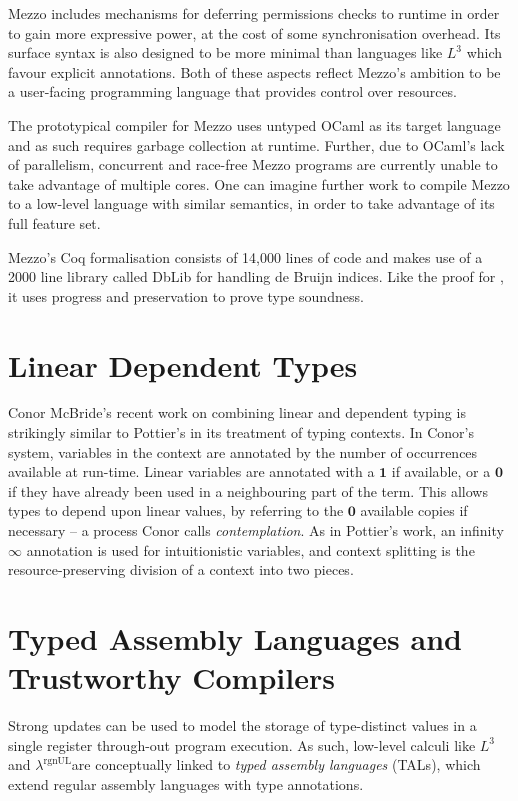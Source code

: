 \documentclass[]{unswthesis}
\newcommand{\rgnUL}{$\lambda^\text{rgnUL}$\text{ }}
\newcommand{\SSPHS}{\text{SSPHS }}
\let\i\textit
\let\b\textbf
\begin{document}
Mezzo includes mechanisms for deferring permissions checks to runtime in order to gain more expressive power, at the cost of some synchronisation overhead. Its surface syntax is also designed to be more minimal than languages like $L^3$ which favour explicit annotations. Both of these aspects reflect Mezzo's ambition to be a user-facing programming language that provides control over resources.

The prototypical compiler for Mezzo uses untyped OCaml as its target language and as such requires garbage collection at runtime. Further, due to OCaml's lack of parallelism, concurrent and race-free Mezzo programs are currently unable to take advantage of multiple cores. One can imagine further work to compile Mezzo to a low-level language with similar semantics, in order to take advantage of its full feature set.

Mezzo's Coq formalisation consists of 14,000 lines of code and makes use of a 2000 line library called DbLib for handling de Bruijn indices. Like the proof for \SSPHS, it uses progress and preservation to prove type soundness.

\section{Linear Dependent Types}
\label{sec:linear-dep}

Conor McBride's recent work on combining linear and dependent typing \cite{mcbride16} is strikingly similar to Pottier's \SSPHS in its treatment of typing contexts. In Conor's system, variables in the context are annotated by the number of occurrences available at run-time. Linear variables are annotated with a $\b{1}$ if available, or a $\b{0}$ if they have already been used in a neighbouring part of the term. This allows types to depend upon linear values, by referring to the $\b{0}$ available copies if necessary -- a process Conor calls \i{contemplation}. As in Pottier's work, an infinity $\infty$ annotation is used for intuitionistic variables, and context splitting is the resource-preserving division of a context into two pieces.

\section{Typed Assembly Languages and Trustworthy Compilers}

Strong updates can be used to model the storage of type-distinct values in a single register through-out program execution. As such, low-level calculi like $L^3$ and \rgnUL are conceptually linked to \i{typed assembly languages} (TALs), which extend regular assembly languages with type annotations.
\end{document}

